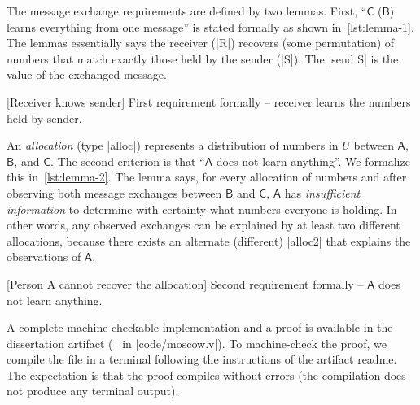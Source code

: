 The message exchange requirements are defined by two lemmas. First,
\enquote{\(\mathsf{C}\) (\resp \(\mathsf{B}\)) learns everything from one
message} is stated formally as shown in~\autoref{lst:lemma-1}. The lemmas
essentially says the receiver (\pr|R|) recovers (some permutation) of numbers
that match exactly those held by the sender (\pr|S|). The \pr|send S| is the
value of the exchanged message.

\begin{center}
\begin{minipage}{\textwidth}
\captionsetup{type=lstlisting}
[Receiver knows sender]{
   First requirement formally -- receiver learns the numbers held by sender.}
\label{lst:lemma-1}
\end{minipage}
\end{center}

An \emph{allocation} (type \pr|alloc|) represents a distribution of numbers in
\(U\) between \(\mathsf{A}\), \(\mathsf{B}\), and \(\mathsf{C}\). The second
criterion is that \enquote{\(\mathsf{A}\) does not learn anything}. We formalize
this in~\autoref{lst:lemma-2}. The lemma says, for every allocation of numbers
and after observing both message exchanges between \(\mathsf{B}\) and
\(\mathsf{C}\), \(\mathsf{A}\) has \emph{insufficient information} to determine
with certainty what numbers everyone is holding. In other words, any observed
exchanges can be explained by at least two different allocations, because there
exists an alternate (different) \pr|alloc2| that explains the observations of
\(\mathsf{A}\).

\begin{center}
\begin{minipage}{\textwidth}
\captionsetup{type=lstlisting}
[Person A cannot recover the allocation]
{Second requirement formally -- \(\mathsf{A}\) does not learn anything.}
\label{lst:lemma-2}
\end{minipage}
\end{center}

A complete machine-checkable implementation and a proof is available in the
dissertation artifact (\cf~ in \pr|code/moscow.v|). To
machine-check the proof, we compile the file in a terminal following the
instructions of the artifact readme. The expectation is that the proof compiles
without errors (the compilation does not produce any terminal output).

